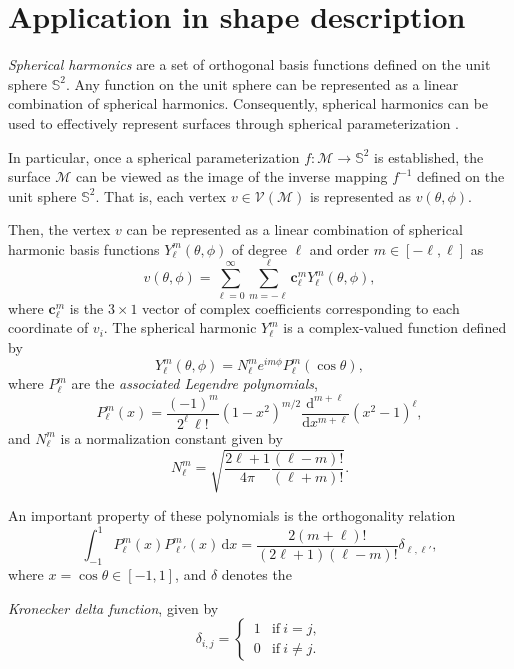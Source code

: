 \documentclass{article}
\numberwithin{equation}{section}
\def\M{\mathcal{M}}
\def\V{\mathcal{V}}
\def\d{\mathrm{d}}
\begin{document}
\section{Application in shape description}
\label{sec:7}
{ \em Spherical harmonics} \cite{Byer59} are a set of orthogonal basis functions defined on the unit sphere $\mathbb{S}^2$. { Any function on the unit sphere can be represented as a linear combination of spherical harmonics.} 
Consequently, spherical harmonics can be used to effectively represent surfaces through spherical parameterization \cite{BrGK95}.

{
In particular, once a spherical parameterization $f:\M\to\mathbb{S}^2$ is established, the surface $\M$ can be viewed as the image of the inverse mapping $f^{-1}$ defined on the unit sphere $\mathbb{S}^2$. That is, each vertex $v\in\V(\M)$ is represented as $v(\theta, \phi)$.} 

Then, the vertex $v$ can be represented as a linear combination of spherical harmonic basis functions $Y_\ell^m (\theta, \phi)$ of degree $\ell$ and order $m \in [-\ell, \ell]$ as
\[
v(\theta, \phi) = \sum_{\ell = 0}^\infty \sum_{m = -\ell}^\ell \mathbf{c}_\ell^m Y_\ell^m(\theta, \phi),
\]
where $\mathbf{c}_\ell^m$ is the $3 \times 1$ vector of complex coefficients corresponding to each coordinate of $v_i$.
The spherical harmonic $Y_\ell^m$ is a complex-valued function defined by 
\begin{equation*}
Y_\ell^m(\theta, \phi) = N_\ell^m  e^{i m \phi} P_\ell^m (\cos \theta),
\end{equation*}
where $P_\ell^m$ are the { \textit{associated Legendre polynomials}},
\[
P_\ell^m(x) = \frac{(-1)^m}{2^\ell \,\ell!} (1-x^2)^{m/2} \frac{\d^{m+\ell}}{\d x^{m+\ell}} (x^2 - 1)^\ell,
\]
and $N_\ell^m$ is a normalization constant given by
\[
N_\ell^m = \sqrt{\frac{2\ell + 1}{4 \pi} \frac{(\ell-m)!}{(\ell+m)!}}.
\]

An important property of these polynomials is the orthogonality relation
\[
\int_{-1}^1 P_\ell^m(x) P_{\ell'}^m(x) \,\d x = \frac{2(m+\ell)!}{(2\ell + 1)(\ell-m)!} \delta_{\ell, \ell'},
\]
where $x = \cos \theta \in [-1,1]$, and $\delta$ denotes the { \textit{Kronecker delta function}, given by
\[
\delta_{i,j} = 
\begin{cases}
    \,1 & \mbox{if}~ i = j,\\
    \,0 & \mbox{if}~ i \neq j.
\end{cases}
\]

}
\end{document}
